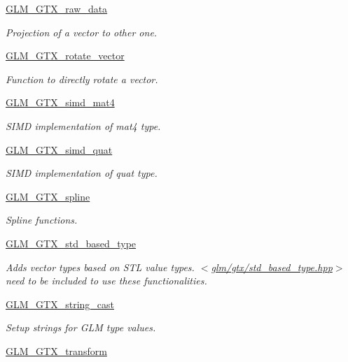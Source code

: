 \begin{DoxyCompactItemize}
\hyperlink{group__gtx__raw__data}{G\+L\+M\+\_\+\+G\+T\+X\+\_\+raw\+\_\+data}
\begin{DoxyCompactList}\small\item\em Projection of a vector to other one. \end{DoxyCompactList}\item 
\hyperlink{group__gtx__rotate__vector}{G\+L\+M\+\_\+\+G\+T\+X\+\_\+rotate\+\_\+vector}
\begin{DoxyCompactList}\small\item\em Function to directly rotate a vector. \end{DoxyCompactList}\item 
\hyperlink{group__gtx__simd__mat4}{G\+L\+M\+\_\+\+G\+T\+X\+\_\+simd\+\_\+mat4}
\begin{DoxyCompactList}\small\item\em S\+I\+MD implementation of mat4 type. \end{DoxyCompactList}\item 
\hyperlink{group__gtx__simd__vec4}{G\+L\+M\+\_\+\+G\+T\+X\+\_\+simd\+\_\+quat}
\begin{DoxyCompactList}\small\item\em S\+I\+MD implementation of quat type. \end{DoxyCompactList}\item 
\hyperlink{group__gtx__spline}{G\+L\+M\+\_\+\+G\+T\+X\+\_\+spline}
\begin{DoxyCompactList}\small\item\em Spline functions. \end{DoxyCompactList}\item 
\hyperlink{group__gtx__std__based__type}{G\+L\+M\+\_\+\+G\+T\+X\+\_\+std\+\_\+based\+\_\+type}
\begin{DoxyCompactList}\small\item\em Adds vector types based on S\+TL value types. $<$\hyperlink{std__based__type_8hpp}{glm/gtx/std\+\_\+based\+\_\+type.\+hpp}$>$ need to be included to use these functionalities. \end{DoxyCompactList}\item 
\hyperlink{group__gtx__string__cast}{G\+L\+M\+\_\+\+G\+T\+X\+\_\+string\+\_\+cast}
\begin{DoxyCompactList}\small\item\em Setup strings for G\+LM type values. \end{DoxyCompactList}\item 
\hyperlink{group__gtx__transform}{G\+L\+M\+\_\+\+G\+T\+X\+\_\+transform}

\end{DoxyCompactItemize}

